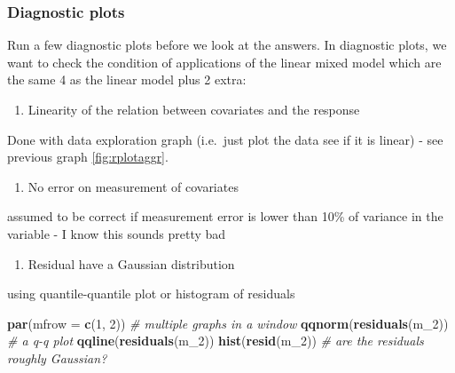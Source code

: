 \documentclass[
  12pt,
]{book}
\newenvironment{Shaded}{\begin{snugshade}}{\end{snugshade}}
\newcommand{\CommentTok}[1]{\textcolor[rgb]{0.56,0.35,0.01}{\textit{#1}}}
\newcommand{\DataTypeTok}[1]{\textcolor[rgb]{0.13,0.29,0.53}{#1}}
\newcommand{\DecValTok}[1]{\textcolor[rgb]{0.00,0.00,0.81}{#1}}
\newcommand{\KeywordTok}[1]{\textcolor[rgb]{0.13,0.29,0.53}{\textbf{#1}}}
\newcommand{\NormalTok}[1]{#1}
\providecommand{\tightlist}{%
  \setlength{\itemsep}{0pt}\setlength{\parskip}{0pt}}
\begin{document}
\hypertarget{diagnostic-plots}{%
\subsubsection{Diagnostic plots}\label{diagnostic-plots}}

Run a few diagnostic plots before we look at the answers. In diagnostic plots, we want to check the condition of applications of the linear mixed model which are the same 4 as the linear model plus 2 extra:

\begin{enumerate}
\def\labelenumi{\arabic{enumi}.}
\tightlist
\item
  Linearity of the relation between covariates and the response
\end{enumerate}

Done with data exploration graph (i.e.~just plot the data see if it is linear)
- see previous graph \ref{fig:rplotaggr}.

\begin{enumerate}
\def\labelenumi{\arabic{enumi}.}
\setcounter{enumi}{1}
\tightlist
\item
  No error on measurement of covariates
\end{enumerate}

assumed to be correct if measurement error is lower than 10\% of variance in the variable
- I know this sounds pretty bad

\begin{enumerate}
\def\labelenumi{\arabic{enumi}.}
\setcounter{enumi}{2}
\tightlist
\item
  Residual have a Gaussian distribution
\end{enumerate}

using quantile-quantile plot or histogram of residuals

\begin{Shaded}
\begin{Highlighting}[]
\KeywordTok{par}\NormalTok{(}\DataTypeTok{mfrow =} \KeywordTok{c}\NormalTok{(}\DecValTok{1}\NormalTok{, }\DecValTok{2}\NormalTok{)) }\CommentTok{\# multiple graphs in a window}
\KeywordTok{qqnorm}\NormalTok{(}\KeywordTok{residuals}\NormalTok{(m\_}\DecValTok{2}\NormalTok{)) }\CommentTok{\# a q{-}q plot}
\KeywordTok{qqline}\NormalTok{(}\KeywordTok{residuals}\NormalTok{(m\_}\DecValTok{2}\NormalTok{))}
\KeywordTok{hist}\NormalTok{(}\KeywordTok{resid}\NormalTok{(m\_}\DecValTok{2}\NormalTok{)) }\CommentTok{\# are the residuals roughly Gaussian?}
\end{Highlighting}
\end{Shaded}
\end{document}
